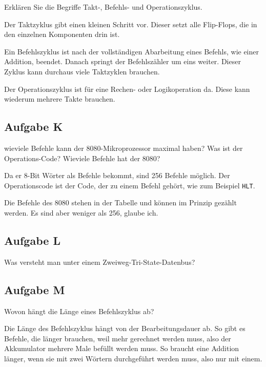 \begin{problem}
	Erklären Sie die Begriffe Takt-, Befehls- und Operationszyklus.
\end{problem}

Der Taktzyklus gibt einen kleinen Schritt vor. Dieser setzt alle Flip-Flops,
die in den einzelnen Komponenten drin ist.

Ein Befehlszyklus ist nach der
vollständigen Abarbeitung eines Befehls, wie einer Addition, beendet. Danach
springt der Befehlszähler um eins weiter. Dieser Zyklus kann durchaus viele
Taktzyklen brauchen.

Der Operationszyklus ist für eine Rechen- oder Logikoperation da. Diese kann
wiederum mehrere Takte brauchen.

\subsection{Aufgabe K}

\begin{problem}
	wieviele Befehle kann der 8080-Mikroprozessor maximal haben? Was ist der
	Operations-Code? Wieviele Befehle hat der 8080?
\end{problem}

Da er 8-Bit Wörter als Befehle bekommt, sind 256 Befehle möglich. Der
Operationscode ist der Code, der zu einem Befehl gehört, wie zum Beispiel
\texttt{HLT}.

Die Befehle des 8080 stehen in der Tabelle und können im Prinzip gezählt
werden. Es sind aber weniger als 256, glaube ich.

\subsection{Aufgabe L}

\begin{problem}
	Was versteht man unter einem Zweiweg-Tri-State-Datenbus?
\end{problem}

\fehlt

\subsection{Aufgabe M}

\begin{problem}
	Wovon hängt die Länge eines Befehlszyklus ab?
\end{problem}

Die Länge des Befehlszyklus hängt von der Bearbeitungsdauer ab. So gibt es
Befehle, die länger brauchen, weil mehr gerechnet werden muss, also der
Akkumulator mehrere Male befüllt werden muss. So braucht eine Addition länger,
wenn sie mit zwei Wörtern durchgeführt werden muss, also nur mit einem.


